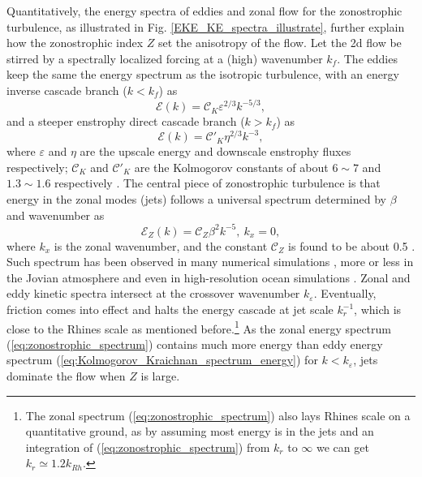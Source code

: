 \documentclass{ametsoc}
\begin{document}
Quantitatively, the energy spectra of eddies and zonal flow for the
zonostrophic turbulence, as 
illustrated in Fig. \ref{EKE_KE_spectra_illustrate}, further
explain how the zonostrophic index $Z$ set the anisotropy of the flow. 
Let the 2d flow be stirred by a spectrally localized forcing at a (high) wavenumber $k_{f}$.
The eddies keep the same the energy spectrum as the isotropic turbulence,
with an energy inverse cascade branch ($k<k_f$) as 
\begin{equation}
    \mathcal{E}(k)=\mathcal{C}_K\varepsilon^{2/3}k^{-5/3},\label{eq:Kolmogorov_Kraichnan_spectrum_energy}
\end{equation}
and a steeper enstrophy direct cascade branch ($k>k_f$) as
\begin{equation}
    \mathcal{E}(k)=\mathcal{C'}_K\eta^{2/3}k^{-3},\label{eq:Kolmogorov_Kraichnan_spectrum_enstrophy}
\end{equation}
where $\varepsilon$ and $\eta$ are the upscale energy and downscale enstrophy
fluxes respectively; $\mathcal{C}_K$ and $\mathcal{C'}_K$ 
are the Kolmogorov constants of about $6\sim7$ and $1.3\sim1.6$ respectively
\citep{Maltrud1991,Smith1993,Paret1997,Chen2006,Borue1993,Gotoh1998}.
The central piece of zonostrophic turbulence is that 
energy in the zonal modes (jets) follows a universal spectrum determined
by $\beta$ and wavenumber as
\begin{equation}
\mathcal{E}_{Z}(k)=\mathcal{C}_Z\beta^{2}k^{-5},\ k_{x}=0,\label{eq:zonostrophic_spectrum}
\end{equation}
where $k_{x}$ is the zonal wavenumber, and the constant $\mathcal{C}_Z$
is found to be about 0.5 \citep{Sukoriansky2002,Smith2002,Galperin2010}.
Such spectrum has been observed in many numerical simulations 
\citep{Chekhlov1996,Smith2002,Huang2001,Sukoriansky2002,Sukoriansky2007},
more or less in the Jovian atmosphere \citep{Sukoriansky2002,Choi2011,Galperin2014}
and even in high-resolution ocean simulations \citep{Galperin2004}.
Zonal and eddy kinetic spectra intersect at the crossover wavenumber $k_{\varepsilon}$.
Eventually, friction comes into effect and halts the energy cascade at jet scale $k_r^{-1}$,
which is close to the Rhines scale as mentioned before.\footnote{
The zonal spectrum (\ref{eq:zonostrophic_spectrum})
also lays Rhines scale on a quantitative ground, as by assuming
most energy is in the jets and an integration of (\ref{eq:zonostrophic_spectrum}) 
from $k_{r}$ to $\infty$ we can get $k_{r}\simeq1.2k_{Rh}$.}
As the zonal energy spectrum (\ref{eq:zonostrophic_spectrum}) 
contains much more energy than eddy energy spectrum 
(\ref{eq:Kolmogorov_Kraichnan_spectrum_energy}) for $k<k_\varepsilon$,
jets dominate the flow when $Z$ is large.
\end{document}

